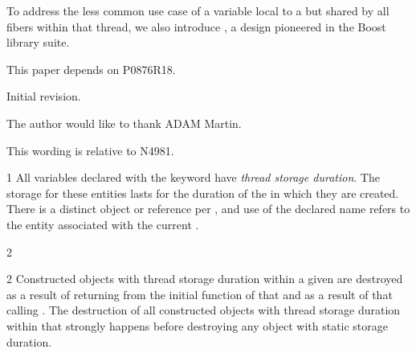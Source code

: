 \documentclass[fontsize=10pt,paper=A4,pagesize,DIV=15]{scrartcl}
\begin{document}
To address the less common use case of a variable local to a \thread but
shared by all fibers within that thread, we also introduce \tptr, a design
pioneered in the Boost library suite.\cite{Boost}

This paper depends on P0876R18.

\label{history}
Initial revision.


{}

The author would like to thank ADAM Martin.

\label{api}

This wording is relative to N4981\cite{Standard}.


1 All variables declared with the  keyword have
\emph{thread storage duration}.
The storage for these entities lasts for the duration of
the  in which they are created. There is a distinct object or reference
per , and use of the declared name refers to the entity associated with
the current .

2 


2 Constructed objects with thread storage duration within a given 
are destroyed as a result of returning from the initial function of that  and as a
result of that  calling .
The destruction of all constructed objects with thread storage
duration within that  strongly happens before destroying
any object with static storage duration.

\end{document}
